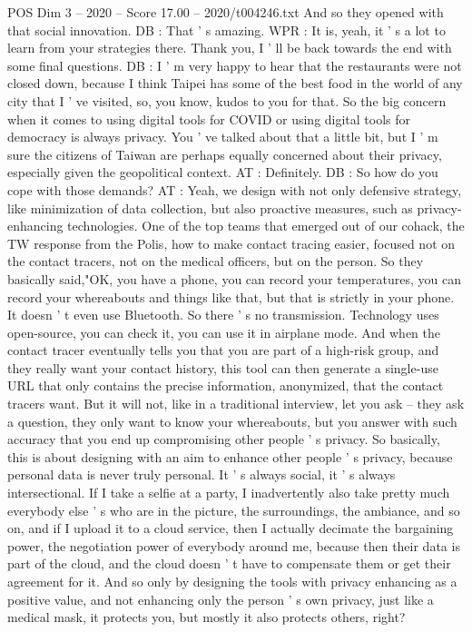 \begin{textsample}{POS Dim 3 – 2020 – Score 17.00 – 2020/t004246.txt}
And so they opened with that social innovation.
DB : That ' s amazing.
WPR : It is, yeah, it ' s a lot to learn from your strategies there.
Thank you, I ' ll be back towards the end with some final questions.
DB : I ' m very happy to hear that the restaurants were not closed down, because I think Taipei has some of the best food in the world of any city that I ' ve visited, so, you know, kudos to you for that.
So the big concern when it comes to using digital tools for COVID or using digital tools for democracy is always privacy.
You ' ve talked about that a little bit, but I ' m sure the citizens of Taiwan are perhaps equally concerned about their privacy, especially given the geopolitical context.
AT : Definitely.
DB : So how do you cope with those demands?
AT : Yeah, we design with not only defensive strategy, like minimization of data collection, but also proactive measures, such as privacy-enhancing technologies.
One of the top teams that emerged out of our cohack, the TW response from the Polis, how to make contact tracing easier, focused not on the contact tracers, not on the medical officers, but on the person.
So they basically said,"OK, you have a phone, you can record your temperatures, you can record your whereabouts and things like that, but that is strictly in your phone.
It doesn ' t even use Bluetooth.
So there ' s no transmission.
Technology uses open-source, you can check it, you can use it in airplane mode.
And when the contact tracer eventually tells you that you are part of a high-risk group, and they really want your contact history, this tool can then generate a single-use URL that only contains the precise information, anonymized, that the contact tracers want.
But it will not, like in a traditional interview, let you ask -- they ask a question, they only want to know your whereabouts, but you answer with such accuracy that you end up compromising other people ' s privacy.
So basically, this is about designing with an aim to enhance other people ' s privacy, because personal data is never truly personal.
It ' s always social, it ' s always intersectional.
If I take a selfie at a party, I inadvertently also take pretty much everybody else ' s who are in the picture, the surroundings, the ambiance, and so on, and if I upload it to a cloud service, then I actually decimate the bargaining power, the negotiation power of everybody around me, because then their data is part of the cloud, and the cloud doesn ' t have to compensate them or get their agreement for it.
And so only by designing the tools with privacy enhancing as a positive value, and not enhancing only the person ' s own privacy, just like a medical mask, it protects you, but mostly it also protects others, right?

\end{textsample}
